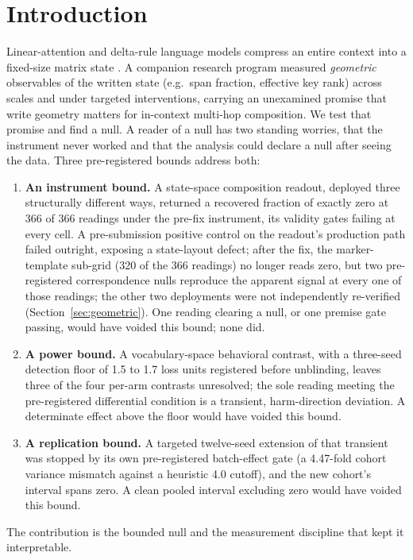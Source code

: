 \section{Introduction}

Linear-attention and delta-rule language models compress an entire context
into a fixed-size matrix state
\citep{schlag2021linear,yang2024parallelizing}. A companion research program
measured \emph{geometric} observables of the written state (e.g.\ span
fraction, effective key rank) across scales and under targeted
interventions, carrying an unexamined promise that write geometry matters
for in-context multi-hop composition. We test that promise and find a
null. A reader of a null has two standing worries, that the instrument
never worked and that the analysis could declare a null after seeing the
data. Three pre-registered bounds address both:

\begin{enumerate}[leftmargin=1.5em,itemsep=1pt,topsep=2pt]
\item \textbf{An instrument bound.} A state-space composition readout,
deployed three structurally different ways, returned a recovered fraction of
exactly zero at 366 of 366 readings under the pre-fix instrument,
its validity gates failing at every cell. A pre-submission positive
control on the readout's production path failed outright, exposing a
state-layout defect; %
after the fix, the marker-template sub-grid (320 of the 366 readings) no
longer reads zero, %
but two pre-registered correspondence nulls reproduce the apparent signal
at every one of those readings; %
the other two deployments were not independently re-verified
(Section~\ref{sec:geometric}). One reading clearing a null, or one premise
gate passing, would have voided this bound; none did.
\item \textbf{A power bound.} A vocabulary-space behavioral contrast, with
a three-seed detection floor of 1.5 to 1.7 loss units registered before
unblinding, %
leaves three of the four per-arm contrasts unresolved; the sole reading meeting the
pre-registered differential condition is a transient, harm-direction
deviation. %
A determinate effect above the floor would have voided this bound.
\item \textbf{A replication bound.} A targeted twelve-seed extension of
that transient was stopped by its own pre-registered batch-effect gate
(a 4.47-fold cohort variance mismatch against a heuristic 4.0 cutoff),
and the new cohort's interval spans zero. A clean pooled interval excluding
zero would have voided this bound.
\end{enumerate}

The contribution is the bounded null and the measurement discipline that
kept it interpretable.

